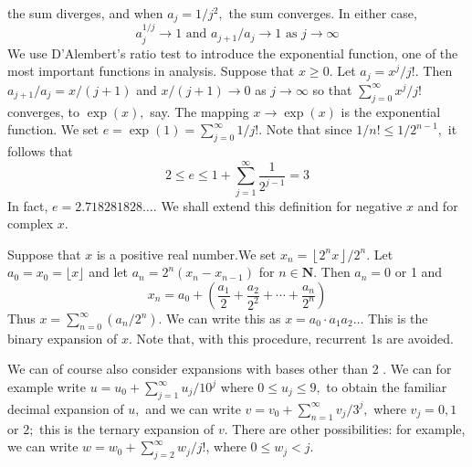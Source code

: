 \documentclass[12pt]{book}
\theoremstyle{definition}\newtheorem{dfn}{Définition}[chapter]
\theoremstyle{plain}\newtheorem{thm}{Théorème}[chapter]
\theoremstyle{plain}\newtheorem{prp}{Proposition}[chapter]
\theoremstyle{plain}\newtheorem{lem}{\bf Lemme}[chapter]
\theoremstyle{plain}\newtheorem{axm}{\bf Axiome}[chapter]
\theoremstyle{plain}\newtheorem{lmm}{\bf Lemme}[chapter]
\theoremstyle{plain}\newtheorem{exm}{\bf Example}[chapter]
\theoremstyle{plain}\newtheorem{cor}{\bf Corollaire}[chapter]
\theoremstyle{remark}\newtheorem{rem}{Remarque}[chapter]
\begin{document}
the sum diverges, and when $a_{j}=1 / j^{2},$ the sum converges. In either case,
$$
a_{j}^{1 / j} \rightarrow 1 \text { and } a_{j+1} / a_{j} \rightarrow 1 \text { as } j \rightarrow \infty
$$
We use D'Alembert's ratio test to introduce the exponential function, one of the most important functions in analysis. Suppose that $x \geq 0 .$ Let $a_{j}=x^{j} / j !$. Then $a_{j+1} / a_{j}=x /(j+1)$ and $x /(j+1) \rightarrow 0$ as $j \rightarrow \infty$
so that $\sum_{j=0}^{\infty} x^{j} / j !$ converges, to $\exp (x),$ say. The mapping $x \rightarrow \exp (x)$ is the exponential function. We set $e=\exp (1)=\sum_{j=0}^{\infty} 1 / j ! .$ Note that since $1 / n ! \leq 1 / 2^{n-1},$ it follows that
$$
2 \leq e \leq 1+\sum_{j=1}^{\infty} \frac{1}{2^{j-1}}=3
$$
In fact, $e=2.718281828 \ldots .$ We shall extend this definition for negative $x$ and for complex $x$.

 Suppose that $x$ is a positive real number.We set $x_{n}=\left\lfloor 2^{n} x\right\rfloor / 2^{n}$. Let $a_{0}=x_{0}=\lfloor x\rfloor$ and let $a_{n}=2^{n}\left(x_{n}-x_{n-1}\right)$ for $n \in \mathbf{N} .$ Then $a_{n}=0$ or 1 and
$$
x_{n}=a_{0}+\left(\frac{a_{1}}{2}+\frac{a_{2}}{2^{2}}+\cdots+\frac{a_{n}}{2^{n}}\right)
$$
Thus $x=\sum_{n=0}^{\infty}\left(a_{n} / 2^{n}\right) .$ We can write this as
$x=a_{0} \cdot a_{1} a_{2} \ldots$
This is the binary expansion of $x .$ Note that, with this procedure, recurrent 1s are avoided.

We can of course also consider expansions with bases other than 2 . We can for example write $u=u_{0}+\sum_{j=1}^{\infty} u_{j} / 10^{j}$ where $0 \leq u_{j} \leq 9,$ to obtain the familiar decimal expansion of $u,$ and we can write $v=v_{0}+\sum_{n=1}^{\infty} v_{j} / 3^{j},$ where $v_{j}=0,1$ or $2 ;$ this is the ternary expansion of $v .$ There are other possibilities:
for example, we can write $w=w_{0}+\sum_{j=2}^{\infty} w_{j} / j !$, where $0 \leq w_{j}<j$.
\end{document}
